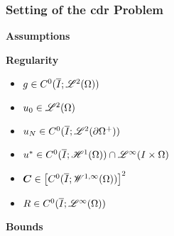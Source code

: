 \begin{frame}
    \frametitle{Setting of the \acrlong{cdr} Problem}

    \vspace*{\fill}
    \begin{center}
        {\color{\accentcolor} \Large \textbf{Assumptions}}
    \end{center}

    \begin{multicols}{2}

        \begin{center}
            {\color{\accentcolor} \Large \textbf{Regularity}}
            \vspace*{0.5cm}
            
            \begin{minipage}{0.4\textwidth}
                \begin{itemize}
                    \item $g \in C^0(\overline{I}; \mathscr{L}^{2}(\Omega))$
                    \item $u_0 \in \mathscr{L}^{2}(\Omega)$
                    \item $u_N \in C^0(\overline{I}; \mathscr{L}^{2}(\partial \Omega^+))$
                    \item { \color{\accentcolor} $u^* \in C^0(\overline{I}; \mathscr{H}^{1}(\Omega)) \cap \mathscr{L}^{\infty}(I \times \Omega)$}
                    \item $\bm{C} \in \left[ C^0(\overline{I}; \mathscr{W}^{1, \infty}(\Omega)) \right]^2$
                    \item $R \in C^0(\overline{I}; \mathscr{L}^{\infty}(\Omega))$
                \end{itemize}
            \end{minipage}
        \end{center}

        \vfill\null
        \columnbreak

        \begin{center}
            {\color{\accentcolor} \Large \textbf{Bounds}}
            \vspace*{0.5cm}
            

\end{center}
\end{multicols}
\end{frame}
